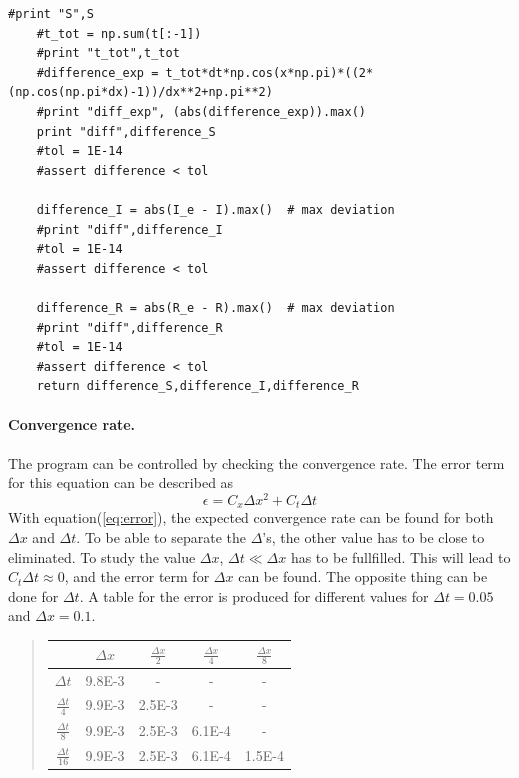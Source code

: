 \documentclass[%
twoside,                 %
final,                   %
10pt]{article}
\begin{document}
\begin{Verbatim}[numbers=none,fontsize=\fontsize{9pt}{9pt},baselinestretch=0.95]
    #print "S",S
    #t_tot = np.sum(t[:-1])
    #print "t_tot",t_tot
    #difference_exp = t_tot*dt*np.cos(x*np.pi)*((2*(np.cos(np.pi*dx)-1))/dx**2+np.pi**2)
    #print "diff_exp", (abs(difference_exp)).max()
    print "diff",difference_S
    #tol = 1E-14
    #assert difference < tol
    
    difference_I = abs(I_e - I).max()  # max deviation
    #print "diff",difference_I
    #tol = 1E-14
    #assert difference < tol
   
    difference_R = abs(R_e - R).max()  # max deviation
    #print "diff",difference_R
    #tol = 1E-14
    #assert difference < tol
    return difference_S,difference_I,difference_R
\end{Verbatim}

\paragraph{Convergence rate.}
The program can be controlled by checking the convergence rate. The error term  for this equation can be described as  
\begin{equation} \label{eq:error}
    \epsilon = C_x\Delta x^2 + C_t \Delta t
\end{equation}
With equation(\ref{eq:error}), the expected convergence rate can be found for both $\Delta x$ and $\Delta t$. To be able to separate the $\Delta$'s, the other value has to be close to eliminated. To study the value $\Delta x$,  $\Delta t \ll \Delta x$ has to be fullfilled. This will lead to $C_t\Delta t \approx 0$, and the error term for $\Delta x$ can be found. The opposite thing can  be done for $\Delta t$. A table for the error is produced for different values for $\Delta t = 0.05$ and $\Delta x=0.1$.

\label{table:error_numbers}

\begin{quote}
\begin{tabular}{ccccc}
\hline
\multicolumn{1}{c}{  } & \multicolumn{1}{c}{ $\Delta x$ } & \multicolumn{1}{c}{ $\frac{\Delta x}{2}$ } & \multicolumn{1}{c}{ $\frac{\Delta x}{4}$ } & \multicolumn{1}{c}{ $\frac{\Delta x}{8}$ } \\
\hline
$\Delta t     $       & 9.8E-3                & -                     & -                     & -                     \\
$\frac{\Delta t}{4} $ & 9.9E-3                & 2.5E-3                & -                     & -                     \\
$\frac{\Delta t}{8} $ & 9.9E-3                & 2.5E-3                & 6.1E-4                & -                     \\
$\frac{\Delta t}{16}$ & 9.9E-3                & 2.5E-3                & 6.1E-4                & 1.5E-4                \\
\hline
\end{tabular}
\end{quote}
\end{document}
